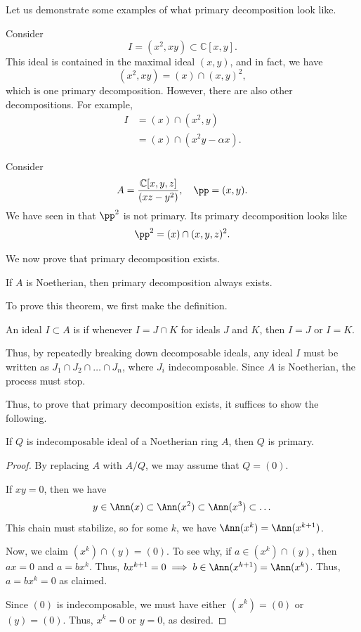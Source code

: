 Let us demonstrate some examples of what primary 
decomposition look like.
\begin{example}
Consider
$$I = (x^2,xy)\subset\mathbb C[x,y].$$
This ideal is contained in the maximal ideal $(x,y)$, and in fact, we have
$$(x^2,xy) = (x)\cap (x,y)^2,$$
which is one primary decomposition.
However, there are also other decompositions. For example,
\begin{align*}
    I &= (x)\cap (x^2,y) \\
      &= (x)\cap (x^2 y-\alpha x).
\end{align*}
\end{example}
\begin{example}
    Consider
    $$A = \frac{\mathbb C[x,y,z]}{(xz-y^2)},\quad \pp=(x,y).$$
    We have seen in  that
    $\pp^2$ is not primary.
    Its primary decomposition looks like
    $$\pp^2 = (x)\cap (x,y,z)^2.$$
\end{example}
We now prove that primary decomposition exists.
\begin{theorem}
    If $A$ is Noetherian, then primary decomposition always exists.
\end{theorem}
To prove this theorem, we first make the definition.
\begin{definition}
    An ideal $I\subset A$ is 
    if whenever $I = J\cap K$ for ideals $J$ and $K$,
    then $I=J$ or $I=K$.
\end{definition}
Thus, by repeatedly breaking down decomposable ideals,
any ideal $I$ must be written as $J_1\cap J_2\cap\dots\cap J_n$,
where $J_i$ indecomposable.
Since $A$ is Noetherian, the process must stop.

Thus, to prove that primary decomposition exists,
it suffices to show the following.
\begin{proposition}
    If $Q$ is indecomposable ideal
    of a Noetherian ring $A$, then $Q$ is primary.
\end{proposition}
\begin{proof}
    By replacing $A$ with $A/Q$, we may assume that $Q=(0)$.

    If $xy=0$, then we have
    $$y\in\Ann(x)\subset\Ann(x^2)\subset \Ann(x^3)\subset\dots$$
    This chain must stabilize, so for some $k$, we have
    $\Ann(x^k) = \Ann(x^{k+1})$.

    Now, we claim $(x^k)\cap (y)=(0)$.
    To see why, if $a\in (x^k)\cap (y)$, then
    $ax=0$ and $a=bx^k$. Thus, $bx^{k+1}=0\implies
    b\in\Ann(x^{k+1}) = \Ann(x^k)$.
    Thus, $a=bx^k = 0$ as claimed.

    Since $(0)$ is indecomposable, we must have
    either $(x^k) = (0)$ or $(y)=(0)$.
    Thus,  $x^k=0$ or $y=0$, as desired.
\end{proof}
%
%
%
%
%
